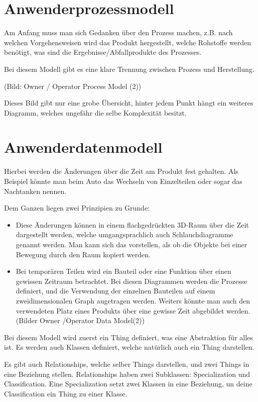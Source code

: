 \section{Anwenderprozessmodell}
Am Anfang muss man sich Gedanken über den Prozess machen, z.B. nach welchen Vorgehensweisen wird das Produkt hergestellt, welche Rohstoffe werden benötigt, was sind die Ergebnisse/Abfallprodukte des Prozesses.

Bei diesem Modell gibt es eine klare Trennung zwischen Prozess und Herstellung.

(Bild: Owner / Operator Process Model (2))

Dieses Bild gibt nur eine grobe Übersicht, hinter jedem Punkt hängt ein weiteres Diagramm, welches ungefähr die selbe Komplexität besitzt.

\section{Anwenderdatenmodell}
Hierbei werden die Änderungen über die Zeit am Produkt fest gehalten. Als Beispiel könnte man beim Auto das Wechseln von Einzelteilen oder sogar das Nachtanken nennen.

Dem Ganzen liegen zwei Prinzipien zu Grunde:

\begin{itemize}
\item Diese Änderungen können in einem flachgedrückten 3D-Raum über die Zeit dargestellt werden, welche umgangsprachlich auch Schlauchdiagramme genannt werden. Man kann sich das vorstellen, als ob die Objekte bei einer Bewegung durch den Raum kopiert werden.
\item Bei temporären Teilen wird ein Bauteil oder eine Funktion über einen gewissen Zeitraum betrachtet. Bei diesen Diagrammen werden die Prozesse definiert, und die Verwendung der einzelnen Bauteilen auf einem zweidimensionalen Graph augetragen werden. Weiters könnte man auch den verwendeten Platz eines Produkts über eine gewisse Zeit abgebildet werden. (Bilder Owner /Operator Data Model(2))
\end{itemize}


Bei diesem Modell wird zuerst ein Thing definiert, was eine Abstraktion für alles ist. Es werden auch Klassen definiert, welche natürlich auch ein Thing darstellen.

Es gibt auch Relationships, welche selber Things darstellen, und zwei Things in eine Beziehung stellen. Relationships haben zwei Subklassen: Specialization und Classification. Eine Specialization setzt zwei Klassen in eine Beziehung, un deine Classification ein Thing zu einer Klasse.

